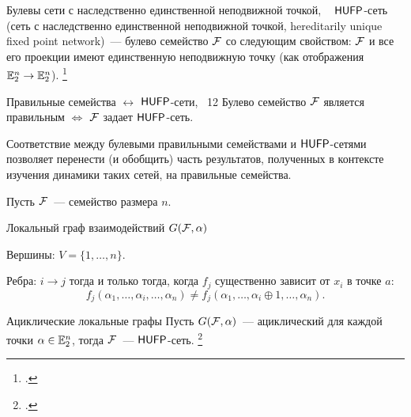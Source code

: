 \begin{frame}%
    \begin{myexample}{Булевы сети с наследственно единственной неподвижной точкой, ~}
        $\mathsf{HUFP}$-сеть (сеть с наследственно единственной неподвижной точкой, hereditarily unique fixed point network)~--- булево семейство $\mathcal{F}$ со следующим свойством: $\mathcal{F}$ и все его проекции имеют единственную неподвижную точку (как отображения $\mathbb{E}_2^n \to \mathbb{E}_2^n$).
        \footcitetext{richard2015fixed}
    \end{myexample}
    \pause 
    \begin{mytheorem}{Правильные семейства $\leftrightarrow$ $\mathsf{HUFP}$-сети, \thm~12}
        Булево семейство $\mathcal{F}$ является правильным $\Leftrightarrow$ $\mathcal{F}$ задает $\mathsf{HUFP}$-сеть. 
    \end{mytheorem}
    Соответствие между булевыми правильными семействами и $\mathsf{HUFP}$-сетями позволяет перенести (и обобщить) часть результатов, полученных в контексте изучения динамики таких сетей, на правильные семейства.
\end{frame}


\begin{frame}%
    Пусть $\mathcal{F}$~--- семейство размера $n$.
    \begin{myexample}{{Локальный граф взаимодействий $G(\mathcal{F}, \alpha)$}}
        \begin{coloritemize}
        \item Вершины: $V = \{1, \ldots, n\}$.
        \item Ребра: $i \to j$ тогда и только тогда, когда $f_j$ существенно зависит от $x_i$   в точке $a$:
        \[
            f_j(\alpha_1, \ldots, \alpha_i, \ldots, \alpha_n) \ne f_j(\alpha_1, \ldots, \alpha_i \oplus 1, \ldots, \alpha_n).
        \]
        \end{coloritemize}
    \end{myexample}
    \pause 
    \begin{mypropos}{Ациклические локальные графы}
        Пусть $G(\mathcal{F}, \alpha)$~--- ациклический для каждой точки $\alpha \in \mathbb{E}_2^n$, тогда $\mathcal{F}$~--- $\mathsf{HUFP}$-сеть.
        \footcitetext{shih2005combinatorial}
    \end{mypropos}
\end{frame}


